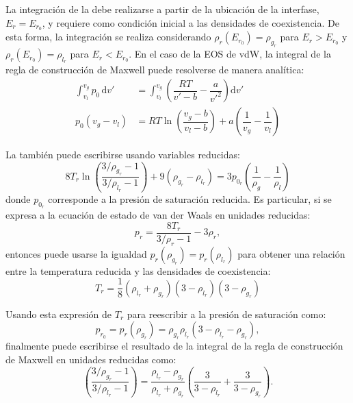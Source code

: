 La integraci\'on de la  debe realizarse a partir de la ubicaci\'on de la interfase, $E_r = E_{r_0}$, y requiere como condici\'on inicial a las densidades de coexistencia. De esta forma, la integraci\'on se realiza considerando $\rho_r(E_{r_0}) = \rho_{g_r}$ para $E_r > E_{r_0}$ y $\rho_r(E_{r_0}) = \rho_{l_r}$ para $E_r < E_{r_0}$. En el caso de la EOS de vdW, la integral de la regla de construcci\'on de Maxwell puede resolverse de manera anal\'itica:
\begin{equation}
	\begin{aligned}
	\int_{v_l}^{v_g} p_0 \, \mbox{d}v' &= \int_{v_l}^{v_g} \left( \dfrac{RT}{v'-b} - \dfrac{a}{v'^2} \right) \mbox{d}v' \\
		p_0(v_g-v_l) &= RT \ln \left( \dfrac{v_g - b}{v_l-b} \right) + a\left( \dfrac{1}{v_g} - \dfrac{1}{v_l} \right)
	\end{aligned}
	\label{eq:vdw_maxwell_analitica}
\end{equation}


La  tambi\'en puede escribirse usando variables reducidas:
\begin{equation}
	8T_r \ln \left( \dfrac{3/\rho_{g_r}-1}{3/\rho_{l_r}-1} \right) + 9(\rho_{g_r} - \rho_{l_r}) = 3p_{0_r} \left( \dfrac{1}{\rho_g} - \dfrac{1}{\rho_l} \right)
\end{equation}
donde $p_{0_r}$ corresponde a la presi\'on de saturaci\'on reducida. Es particular, si se expresa a la ecuaci\'on de estado de van der Waals en unidades reducidas:
\begin{equation}
 p_r = \dfrac{8 T_r}{3/\rho_r-1} - 3\rho_r,
\end{equation}
entonces puede usarse la igualdad $p_r(\rho_{g_r}) = p_r(\rho_{l_r})$ para obtener una relaci\'on entre la temperatura reducida y las densidades de coexistencia:
\begin{equation}
	T_r = \dfrac{1}{8}(\rho_{l_r}+\rho_{g_r})(3-\rho_{l_r})(3-\rho_{g_r})
	\label{eq:tr_maxwell}
\end{equation}

Usando esta expresi\'on de $T_r$ para reescribir a la presi\'on de saturaci\'on como:
\begin{equation}
	p_{r_0} = p_r(\rho_{g_r}) = \rho_{g_r} \rho_{l_r} ( 3 - \rho_{l_r} - \rho_{g_r} ),
\end{equation}
finalmente puede escribirse el resultado de la integral de la regla de construcci\'on de Maxwell en unidades reducidas como:
\begin{equation}
	\left( \dfrac{3/\rho_{g_r}-1}{3/\rho_{l_r}-1} \right) = \dfrac{\rho_{l_r} - \rho_{g_r}}{\rho_{l_r} + \rho_{g_r}}\left( \dfrac{3}{3-\rho_{l_r}} + \dfrac{3}{3-\rho_{g_r}} \right).
	\label{eq:rhor_maxwell}
\end{equation}

